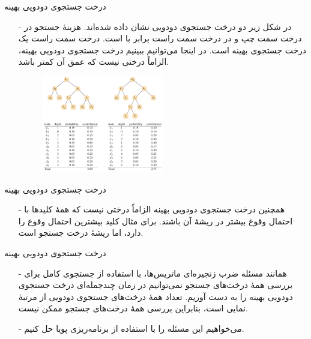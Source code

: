 \begin{frame}{‌درخت جستجوی دودویی بهینه}
\begin{itemize}\itemr
\item[-]
در شکل زیر دو درخت جستجوی دودویی نشان داده شده‌اند. هزینهٔ جستجو در درخت سمت چپ
و در درخت سمت راست برابر با
است. درخت سمت راست یک درخت جستجوی بهینه است. در اینجا می‌توانیم ببینیم درخت جستجوی دودویی بهینه، الزاماً درختی نیست که عمق آن کمتر باشد.
\begin{figure}
\includegraphics[width=0.5\textwidth]{figs/chap04/tree-cost}
\end{figure}
\end{itemize}
\end{frame}


\begin{frame}{‌درخت جستجوی دودویی بهینه}
\begin{itemize}\itemr
\item[-]
همچنین درخت جستجوی دودویی بهینه الزاماً درختی نیست که همهٔ کلیدها با احتمال وقوع بیشتر در ریشهٔ آن باشند. برای مثال کلید
بیشترین احتمال وقوع را دارد، اما ریشهٔ درخت جستجو
است.
\end{itemize}
\end{frame}


\begin{frame}{‌درخت جستجوی دودویی بهینه}
\begin{itemize}\itemr
\item[-]
همانند مسئله ضرب زنجیره‌ای ماتریس‌ها، با استفاده از جستجوی کامل برای بررسی همهٔ درخت‌های جستجو نمی‌توانیم در زمان چندجمله‌ای درخت جستجوی دودویی بهینه را به دست آوریم. تعداد همهٔ
 درخت‌های جستجوی دودویی از مرتبهٔ نمایی است، بنابراین بررسی همهٔ درخت‌های جستجو ممکن نیست.
\item[-]
می‌خواهیم این مسئله را با استفاده از برنامه‌ریزی پویا حل کنیم.
\end{itemize}
\end{frame}


